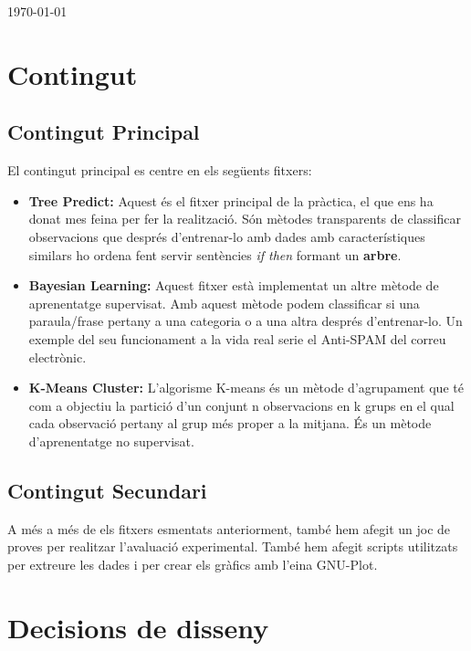 \documentclass[11pt]{article}
\begin{document}
\begin{titlepage}
{\large \today}\\[3cm] %
\vfill %
\end{titlepage}
\newpage
\tableofcontents
\listoftables
\listoffigures
\clearpage
\newpage
\justify
\section{Contingut}
	\subsection{Contingut Principal}
		El contingut principal es centre en els següents fitxers:
		\begin{itemize}
			\item \textbf{Tree Predict:} Aquest és el fitxer principal de la pràctica, el que ens ha donat mes feina per fer la realització. Són mètodes transparents de classificar observacions que després d'entrenar-lo amb dades amb característiques similars ho ordena fent servir sentències \textit{if then} formant un \textbf{arbre}.
			\item \textbf{Bayesian Learning:} Aquest fitxer està implementat un altre mètode de aprenentatge supervisat. Amb aquest mètode podem classificar si una paraula/frase pertany a una categoria o a una altra després d'entrenar-lo. Un exemple del seu funcionament a la vida real serie el Anti-SPAM del correu electrònic.
			\item \textbf{K-Means Cluster:} L'algorisme K-means és un mètode d'agrupament que té com a objectiu la partició d'un conjunt n observacions en k grups en el qual cada observació pertany al grup més proper a la mitjana. És un mètode d'aprenentatge no supervisat.
		\end{itemize}
	\subsection{Contingut Secundari}
		A més a més de els fitxers esmentats anteriorment, també hem afegit un joc de proves per realitzar l'avaluació experimental. També hem afegit scripts utilitzats per extreure les dades i per crear els gràfics amb l'eina GNU-Plot.
\newpage
\section{Decisions de disseny}
\end{document}
